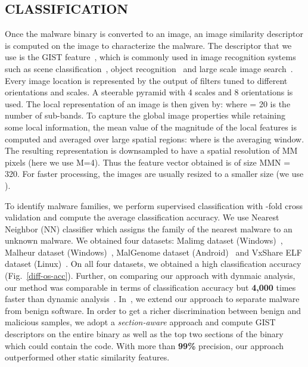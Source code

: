 \documentclass[journal]{IEEEtran}
\begin{document}
\subsection*{CLASSIFICATION}
 Once the malware binary is converted to an image, an image similarity descriptor is computed on the image to characterize the malware. 
The descriptor that we use is the GIST feature~\cite{gist2}, which is commonly used in image recognition systems such as scene classification~\cite{gist2}, object recognition~\cite{gist1} and large scale image search~\cite{gist-eval}. 
Every image location is represented by the output of filters tuned to different orientations
and scales. 
A steerable pyramid with 4 scales and 8 orientations is used.
The local representation of an image is then given by:  where  = 20 is the number of sub-bands.
To capture the global image properties while retaining some local information, the mean value of the magnitude of the local features is computed and averaged over large spatial regions:  where  is the averaging window. 
The resulting representation is downsampled to have a spatial resolution of MM pixels (here we use M=4).
Thus the feature vector obtained is of size MMN = 320. 
For faster processing, the images are usually resized to a smaller size (we use ).

 To identify malware families, we perform supervised classification with -fold cross validation and compute the average classification accuracy.
We use Nearest Neighbor (NN) classifier which assigns the family of the nearest malware to an unknown malware. 
We obtained four datasets: Malimg dataset (Windows)~\cite{malimg-ds}, Malheur dataset (Windows)~\cite{malheur}, MalGenome dataset (Android)~\cite{malgenome} and VxShare ELF dataset (Linux)~\cite{vxshare}.
On all four datasets, we obtained a high classification accuracy (Fig.~\ref{diff-os-acc}).
Further, on comparing our approach with dynmaic analysis, our method was comparable in terms of classification accuracy but {\bf 4,000} times faster than dynamic analysis~\cite{comp-assm}.  
In~\cite{sigmal}, we extend our approach to separate malware from benign software.
In order to get a richer discrimination between benign and malicious samples, we adopt a \emph{section-aware} approach and compute GIST descriptors on the entire binary as well as the top two sections of the binary which could contain the code. 
With more than {\bf 99\%} precision, our approach outperformed other static similarity features.
\end{document}
